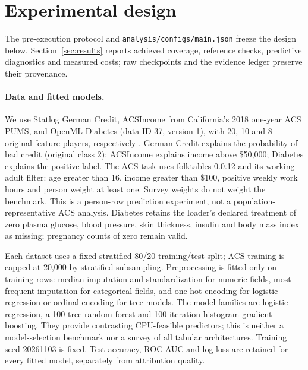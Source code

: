 \section{Experimental design}
\label{sec:study}

The pre-execution protocol and \texttt{analysis/configs/main.json} freeze the design below. Section~\ref{sec:results} reports achieved coverage, reference checks, predictive diagnostics and measured costs; raw checkpoints and the evidence ledger preserve their provenance.

\paragraph{Data and fitted models.}
We use Statlog German Credit, ACSIncome from California's 2018 one-year ACS PUMS, and OpenML Diabetes (data ID 37, version 1), with 20, 10 and 8 original-feature players, respectively \citep{hofmann1994,uscensus2018pums,ding2021retiring,openml37}. German Credit explains the probability of bad credit (original class 2); ACSIncome explains income above \$50,000; Diabetes explains the positive label. The ACS task uses folktables 0.0.12 and its working-adult filter: age greater than 16, income greater than \$100, positive weekly work hours and person weight at least one. Survey weights do not weight the benchmark. This is a person-row prediction experiment, not a population-representative ACS analysis. Diabetes retains the loader's declared treatment of zero plasma glucose, blood pressure, skin thickness, insulin and body mass index as missing; pregnancy counts of zero remain valid.

Each dataset uses a fixed stratified 80/20 training/test split; ACS training is capped at 20,000 by stratified subsampling. Preprocessing is fitted only on training rows: median imputation and standardization for numeric fields, most-frequent imputation for categorical fields, and one-hot encoding for logistic regression or ordinal encoding for tree models. The model families are logistic regression, a 100-tree random forest and 100-iteration histogram gradient boosting. They provide contrasting CPU-feasible predictors; this is neither a model-selection benchmark nor a survey of all tabular architectures. Training seed 20261103 is fixed. Test accuracy, ROC AUC and log loss are retained for every fitted model, separately from attribution quality.

